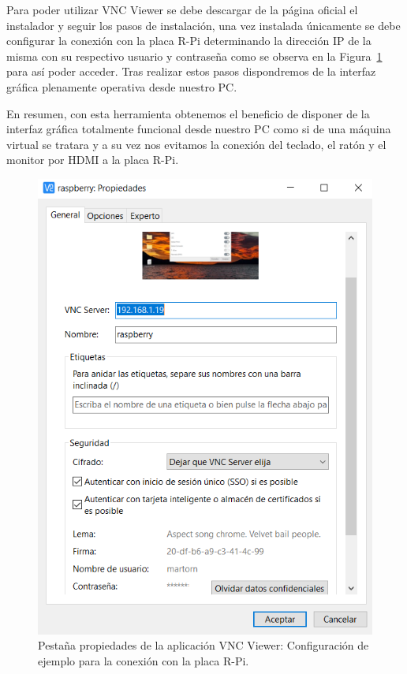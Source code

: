 Para poder utilizar VNC Viewer se debe descargar de la página oficial el instalador y seguir los pasos de instalación, una vez instalada únicamente se debe configurar la conexión con la placa R-Pi determinando la dirección IP de la misma con su respectivo usuario y contraseña como se observa en la Figura~\ref{fig:VNC} para así poder acceder. Tras realizar estos pasos dispondremos de la interfaz gráfica plenamente operativa desde nuestro PC.

En resumen, con esta herramienta obtenemos el beneficio de disponer de la interfaz gráfica totalmente funcional desde nuestro PC como si de una máquina virtual se tratara y a su vez nos evitamos la conexión del teclado, el ratón y el monitor por HDMI a la placa R-Pi.

\begin{figure}[tbh]
\centering
\includegraphics[scale=0.8]{images/vnc.png}
\caption[Configuración de VNC Viewer]{Pestaña propiedades de la aplicación VNC Viewer: Configuración de ejemplo para la conexión con la placa R-Pi.}%
\label{fig:VNC}
\end{figure}

